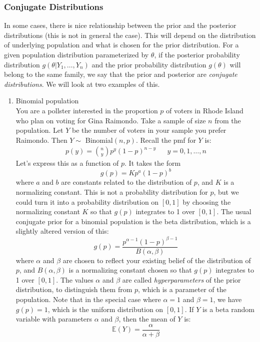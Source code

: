 \documentclass[12pt]{article}
\theoremstyle{definition}
\theoremstyle{remark}
\def\E{{\mathbb E}}
\begin{document}
\subsubsection{Conjugate Distributions}
In some cases, there is nice relationship between the prior and the posterior distributions (this is not in general the case). This will depend on the distribution of underlying population and what is chosen for the prior distribution. For a given population distribution parameterized by $\theta$, if the posterior probability distribution $g(\theta|Y_1, \dots, Y_n)$ and the prior probability distribution $g(\theta)$ will belong to the same family, we say that the prior and posterior are \emph{conjugate distributions}. We will look at two examples of this.\\

\begin{enumerate}
\item Binomial population \\

You are a pollster interested in the proportion $p$ of voters in Rhode Island who plan on voting for Gina Raimondo. Take a sample of size $n$ from the population. Let $Y$ be the number of voters in your sample you prefer Raimondo. Then $Y \sim$ Binomial$(n, p)$. Recall the pmf for $Y$ is:
\begin{align*}
p(y) = \binom{n}{y}p^{y}(1-p)^{n-y} && y = 0, 1, \dots, n
\end{align*} 
Let's express this as a function of $p$. It takes the form
\[
g(p) = K p^a (1-p)^b
\]
where $a$ and $b$ are constants related to the distribution of $p$, and $K$ is a normalizing constant. This is not a probability distribution for $p$, but we could turn it into a probability distribution on $[0, 1]$ by choosing the normalizing constant $K$ so that $g(p)$ integrates to 1 over $[0, 1]$. The usual conjugate prior for a binomial population is the beta distribution, which is a slightly altered version of this:
\[
g(p) = \frac{ p^{\alpha - 1} (1-p)^{\beta - 1} }{ B(\alpha, \beta) }
\]
where $\alpha$ and $\beta$ are chosen to reflect your existing belief of the distribution of $p$, and $B(\alpha, \beta)$ is a normalizing constant chosen so that $g(p)$ integrates to 1 over $[0, 1]$. The values $\alpha$ and $\beta$ are called \emph{hyperparameters} of the prior distribution, to distinguish them from $p$, which is a parameter of the population. Note that in the special case where $\alpha = 1$ and $\beta = 1$, we have $g(p) = 1$, which is the uniform distribution on $[0, 1]$. If $Y$ is a beta random variable with parameters $\alpha$ and $\beta$, then the mean of $Y$ is:
\[
\E(Y) = \frac{\alpha}{\alpha + \beta}
\]


\end{enumerate}
\end{document}
